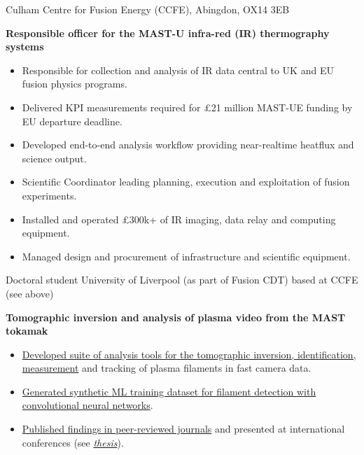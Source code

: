 \documentclass[12pt,a4paper,sans]{moderncv}        %
\begin{document}
{\small Culham Centre for Fusion Energy (CCFE), Abingdon, OX14 3EB}%
{}%
{\normalsize{\textbf{Responsible officer for the MAST-U infra-red (IR) thermography systems}}%
\begin{itemize}%
\item Responsible for \textcolor{mypurple}{collection} and \textcolor{mypurple}{analysis} of IR data central to UK and EU fusion physics programs.
\item \textcolor{mypurple}{Delivered KPI} measurements required for \textcolor{mypurple}{£21 million} MAST-UE funding by EU departure deadline. 
\item Developed end-to-end \textcolor{mypurple}{analysis workflow} providing near-realtime heatflux and science output.
\item \textcolor{mypurple}{Scientific Coordinator} leading planning, execution and exploitation of fusion experiments.
\item \textcolor{mypurple}{Installed} and \textcolor{mypurple}{operated} £300k+ of IR imaging, data relay and computing equipment.
\item Managed \textcolor{mypurple}{design} and \textcolor{mypurple}{procurement} of infrastructure and scientific equipment.
\end{itemize}
}

{\textcolor{mypurple}{Doctoral student}}%
{University of Liverpool (as part of Fusion CDT)}%
{%
 \small based at CCFE (see above)}%
{} %
{\normalsize{\textbf{Tomographic inversion and analysis of plasma video from the MAST tokamak}}
\begin{itemize}%
\item \href{https://pubs.aip.org/aip/rsi/article-abstract/90/9/093502/363323/Filament-identification-in-wide-angle-high-speed?redirectedFrom=fulltext}{Developed suite of analysis tools for the \textcolor{mypurple}{tomographic inversion}, identification, measurement} and tracking of plasma filaments in fast camera data.
\item \href{https://doi.org/10.1016/j.fusengdes.2018.12.071}{Generated synthetic \textcolor{mypurple}{ML training dataset} for filament detection with \textcolor{mypurple}{convolutional neural networks}}.
\item \href{https://orcid.org/0000-0003-2307-6019}{Published findings in \textcolor{mypurple}{peer-reviewed journals}} and presented at \textcolor{mypurple}{international conferences} {\small(see \textcolor{mypurple}{\textit{\href{http://doi.org/10.17638/03066785}{thesis}}})}.
\end{itemize}
}
\end{document}
